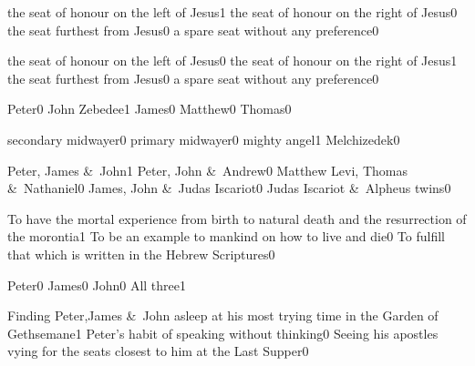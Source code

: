{the seat of honour on the left of Jesus}{1}
{the seat of honour on the right of Jesus}{0}
{the seat furthest from Jesus}{0}
{a spare seat without any preference}{0}
\qstop

{the seat of honour on the left of Jesus}{0}
{the seat of honour on the right of Jesus}{1}
{the seat furthest from Jesus}{0}
{a spare seat without any preference}{0}
\qstop



{Peter}{0}
{John Zebedee}{1}
{James}{0}
{Matthew}{0}
{Thomas}{0}
\qstop


{secondary midwayer}{0}
{primary midwayer}{0}
{mighty angel}{1}
{Melchizedek}{0}
\qstop

{Peter, James \&\ John}{1}
{Peter, John \&\ Andrew}{0}
{Matthew Levi, Thomas \&\ Nathaniel}{0}
{James, John \&\ Judas Iscariot}{0}
{Judas Iscariot \&\ Alpheus twins}{0}
\qstop

{To have the mortal experience from birth to natural death and the resurrection of the morontia}{1}
{To be an example to mankind on how to live and die}{0}
{To fulfill that which is written in the Hebrew Scriptures}{0}
\qstop

{Peter}{0}
{James}{0}
{John}{0}
{All three}{1}
\qstop

{Finding Peter,James \&\ John asleep at his most trying time in the Garden of Gethsemane}{1}
{Peter's habit of speaking without thinking}{0}
{Seeing his apostles vying for the seats closest to him at the Last Supper}{0}
\qstop

